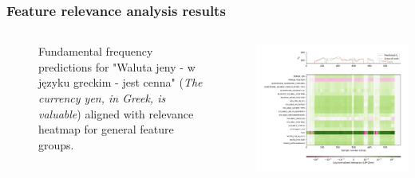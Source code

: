 \documentclass[a4paper,9pt]{beamer}
\theoremstyle{mytheoremstyle}
\begin{document}
\begin{frame}
\frametitle{Feature relevance analysis results}
\begin{columns}
\begin{figure}
	\caption{Fundamental frequency predictions for "Waluta jeny - w j\k{e}zyku greckim - jest cenna" (\textit{The currency yen, in Greek, is valuable}) aligned with relevance heatmap for general feature groups.}
\end{figure}
\begin{center}
  \includegraphics[width=\textwidth]{res/general_feature_categories_amu_pl_ilo_baza_2006d_d0100}
\end{center}
\end{columns}
\end{frame}
\end{document}
